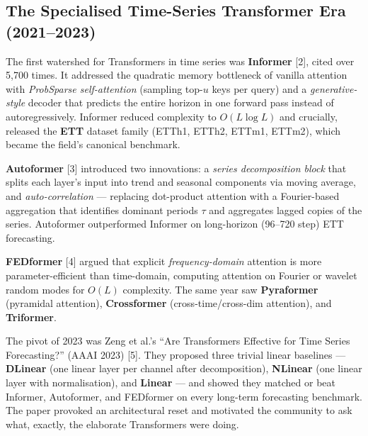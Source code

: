 \documentclass{article}
\begin{document}
\subsection{The Specialised Time-Series Transformer Era (2021--2023)}\label{the-specialised-time-series-transformer-era-20212023}

The first watershed for Transformers in time series was \textbf{Informer} \citep{zhou2021informerbeyondeffi} {[}2{]}, cited over 5,700 times. It addressed the quadratic memory bottleneck of vanilla attention with \emph{ProbSparse self-attention} (sampling top-\(u\) keys per query) and a \emph{generative-style} decoder that predicts the entire horizon in one forward pass instead of autoregressively. Informer reduced complexity to \(O(L \log L)\) and crucially, released the \textbf{ETT} dataset family (ETTh1, ETTh2, ETTm1, ETTm2), which became the field's canonical benchmark.

\textbf{Autoformer} \citep{wu2021autoformerdecompos} {[}3{]} introduced two innovations: a \emph{series decomposition block} that splits each layer's input into trend and seasonal components via moving average, and \emph{auto-correlation} --- replacing dot-product attention with a Fourier-based aggregation that identifies dominant periods \(\tau\) and aggregates lagged copies of the series. Autoformer outperformed Informer on long-horizon (96--720 step) ETT forecasting.

\textbf{FEDformer} \citep{zhou2022fedformerfrequency} {[}4{]} argued that explicit \emph{frequency-domain} attention is more parameter-efficient than time-domain, computing attention on Fourier or wavelet random modes for \(O(L)\) complexity. The same year saw \textbf{Pyraformer} (pyramidal attention), \textbf{Crossformer} (cross-time/cross-dim attention), and \textbf{Triformer}.

The pivot of 2023 was Zeng et al.'s ``Are Transformers Effective for Time Series Forecasting?'' (AAAI 2023) {[}5{]}. They proposed three trivial linear baselines --- \textbf{DLinear} (one linear layer per channel after decomposition), \textbf{NLinear} (one linear layer with normalisation), and \textbf{Linear} --- and showed they matched or beat Informer, Autoformer, and FEDformer on every long-term forecasting benchmark. The paper provoked an architectural reset and motivated the community to ask what, exactly, the elaborate Transformers were doing.
\end{document}
